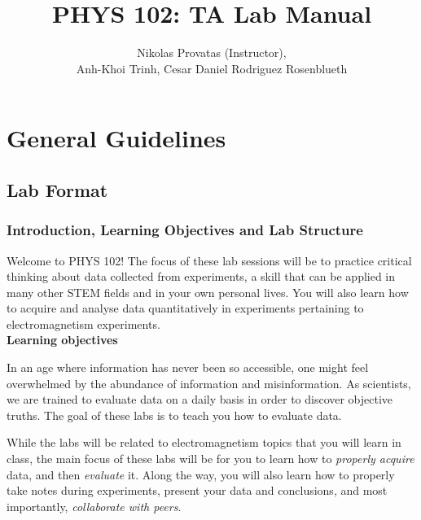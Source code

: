 \documentclass[12pt]{report}
\title{PHYS 102: TA Lab Manual}
\author{Nikolas Provatas (Instructor), \\ Anh-Khoi Trinh, Cesar Daniel Rodriguez Rosenblueth}
\begin{document}
\maketitle

\tableofcontents

\part{General Guidelines} \label{Sec:Intro}

\chapter{Lab Format}

\section{Introduction, Learning Objectives and Lab Structure}
Welcome to PHYS 102! The focus of these lab sessions will be to practice critical thinking about data collected from experiments, a skill that can be applied in many other STEM fields and in your own personal lives. You will also learn how to acquire and analyse data quantitatively in experiments pertaining to electromagnetism experiments. \\

\noindent \large \textbf{Learning objectives} \normalsize

In an age where information has never been so accessible, one might feel overwhelmed by the abundance of information and misinformation.
As scientists, we are trained to evaluate data on a daily basis in order to discover objective truths.
The goal of these labs is to teach you how to evaluate data. 

While the labs will be related to electromagnetism topics that you will learn in class, the main focus of these labs will be for you to learn how to \textit{properly acquire} data, and then \textit{evaluate} it. Along the way, you will also learn how to properly take notes during experiments, present your data and conclusions, and most importantly, \textit{collaborate with peers}. \\

\end{document}

